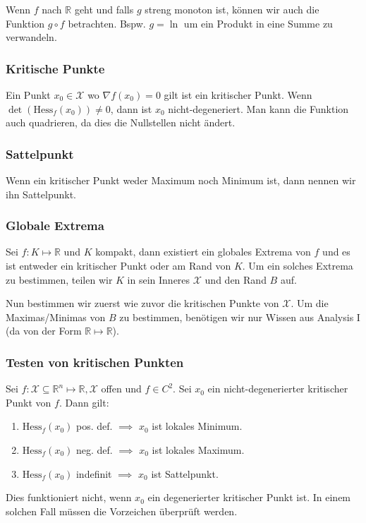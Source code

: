 \documentclass[a4paper,10pt]{article}
\def\R{\mathbb{R}}
\def\X{\mathcal{X}}
\begin{document}
Wenn $f$ nach $\R$ geht und falls $g$ streng monoton ist, können wir auch die Funktion $g \circ f$ betrachten. Bspw. $g = \ln$ um ein Produkt in eine Summe zu verwandeln.

\subsubsection*{Kritische Punkte}
Ein Punkt \(x_0 \in \X\) wo \(\nabla f(x_0) = 0\) gilt ist ein kritischer Punkt. Wenn \(\det(\text{Hess}_f(x_0)) \ne 0\), dann ist \(x_0\) nicht-degeneriert. Man kann die Funktion auch quadrieren, da dies die Nullstellen nicht ändert.

\subsubsection*{Sattelpunkt}
Wenn ein kritischer Punkt weder Maximum noch Minimum ist, dann nennen wir ihn Sattelpunkt.

\subsubsection*{Globale Extrema}
Sei \(f: K \mapsto \R\) und \(K\) kompakt, dann existiert ein globales Extrema von \(f\) und es ist entweder ein kritischer Punkt oder am Rand von \(K\). Um ein solches Extrema zu bestimmen, teilen wir \(K\) in sein Inneres \(\X\) und den Rand \(B\) auf. 

Nun bestimmen wir zuerst wie zuvor die kritischen Punkte von \(\X\). Um die Maximas/Minimas von \(B\) zu bestimmen, benötigen wir nur Wissen aus Analysis I (da von der Form \(\R \mapsto \R\)).
\subsubsection*{Testen von kritischen Punkten}
Sei \(f: \X \subseteq \R^n \mapsto \R, \X\) offen und \(f\in C^2\). Sei \(x_0\) ein nicht-degenerierter kritischer Punkt von \(f\). Dann gilt:
\begin{enumerate}
  \item $\text{Hess}_f(x_0)$ pos. def. \(\implies\) $x_0$ ist lokales Minimum.
  \item $\text{Hess}_f(x_0)$ neg. def. \(\implies\) $x_0$ ist lokales Maximum.
  \item $\text{Hess}_f(x_0)$ indefinit \(\implies\) $x_0$ ist Sattelpunkt.
\end{enumerate}
Dies funktioniert nicht, wenn \(x_0\) ein degenerierter kritischer Punkt ist. In einem solchen Fall müssen die Vorzeichen überprüft werden.
\end{document}
